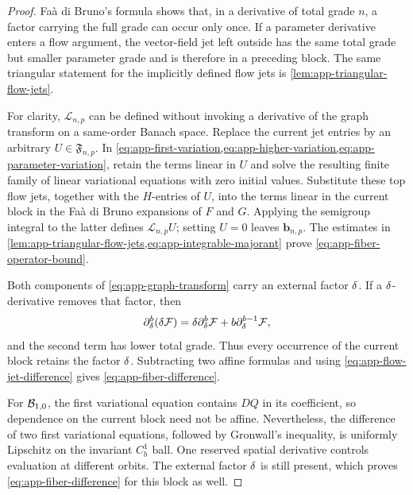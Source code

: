 \begin{proof}
Faà di Bruno's formula shows that, in a derivative of total grade \(n\),
a factor carrying the full grade can occur only once.  If a parameter
derivative enters a flow argument, the vector-field jet left outside has
the same total grade but smaller parameter grade and is therefore in a
preceding block.  The same triangular statement for the implicitly defined
flow jets is \cref{lem:app-triangular-flow-jets}.

For clarity, \(\mathscr L_{n,p}\) can be defined without invoking a
derivative of the graph transform on a same-order Banach space.  Replace
the current jet entries by an arbitrary
\(U\in\mathfrak F_{n,p}\).  In
\cref{eq:app-first-variation,eq:app-higher-variation,eq:app-parameter-variation},
retain the terms linear in \(U\) and solve the resulting finite family of
linear variational equations with zero initial values.  Substitute these
top flow jets, together with the \(H\)-entries of \(U\), into the terms
linear in the current block in the Faà di Bruno expansions of \(F\) and
\(G\).  Applying the semigroup integral to the latter defines
\(\mathscr L_{n,p}U\); setting \(U=0\) leaves
\(\mathbf b_{n,p}\).  The estimates in
\cref{lem:app-triangular-flow-jets,eq:app-integrable-majorant} prove
\cref{eq:app-fiber-operator-bound}.

Both components of \cref{eq:app-graph-transform} carry an external
factor \(\delta\).  If a \(\delta\)-derivative removes that factor, then
\begin{equation}
\label{eq:app-Leibniz-external-delta}
 \partial_\delta^b(\delta\mathcal F)
 =\delta\partial_\delta^b\mathcal F
  +b\partial_\delta^{b-1}\mathcal F,
\end{equation}
and the second term has lower total grade.  Thus every occurrence of the
current block retains the factor \(\delta\).  Subtracting two affine formulas
and using \cref{eq:app-flow-jet-difference} gives
\cref{eq:app-fiber-difference}.

For \(\mathcal B_{1,0}\), the first variational equation contains \(DQ\) in its
coefficient, so dependence on the current block need not be affine.
Nevertheless, the difference of two first variational equations, followed
by Gronwall's inequality, is uniformly Lipschitz on the invariant \(C_b^1\)
ball.  One reserved spatial derivative controls evaluation at different
orbits.  The external factor \(\delta\) is still present, which proves
\cref{eq:app-fiber-difference} for this block as well.
\end{proof}

